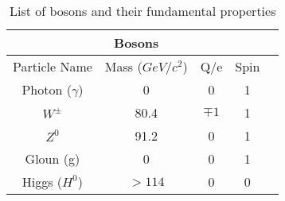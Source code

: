 \begin{table}[!htb]
  \centering
  \begin{tabular}{|c|c|c|c|c|}
  \hline
  \multicolumn{4}{|c|}{Bosons} \\
  \hline
   Particle Name & Mass ($GeV/c^2$) &     Q/e & Spin \\
  \hline
  \hline
  Photon ($\gamma$) &               0 &       0 &    1 \\
  \hline
  $W^\pm$           &            80.4 & $\mp 1$ &    1 \\
  $Z^0$             &            91.2 &       0 &    1 \\
  \hline
  Gloun (g)         &               0 &       0 &    1 \\
  Higgs ($H^0$)     &         $> 114$ &       0 &    0 \\
  \hline
  \end{tabular}
  \caption[List of bosons and their fundamental properties]{List of bosons and their fundamental properties}
  \label{TheoreticalIntroduction_BosonProperties}
\end{table}
